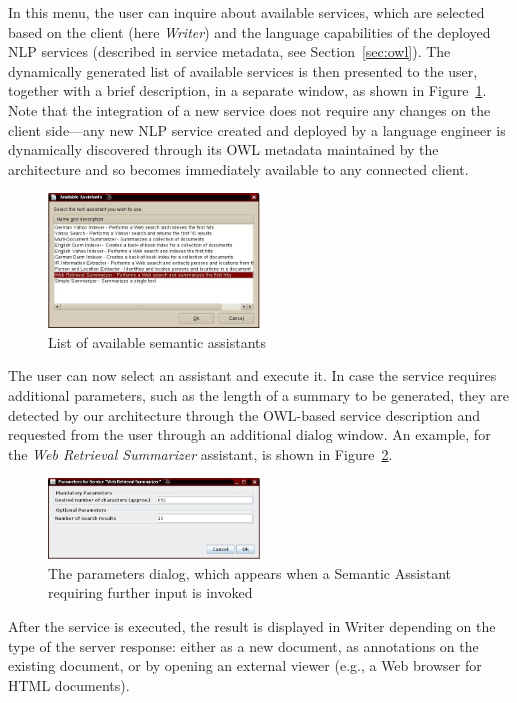 In this menu, the user can inquire about available services, which are
selected based on the client (here \emph{Writer}) and the language
capabilities of the deployed NLP services (described in service
metadata, see Section~\ref{sec:owl}). The dynamically generated list
of available services is then presented to the user, together with a
brief description, in a separate window, as shown in
Figure~\ref{fig:oolist}. Note that the integration of a new service
does not require any changes on the client side---any new NLP service
created and deployed by a language engineer is dynamically discovered
through its OWL metadata maintained by the architecture and so becomes
immediately available to any connected client.
\begin{figure}[htb]
  \centering
  \includegraphics[width=0.5\textwidth]{pictures/oolist.jpg}
  \caption{List of available semantic assistants}
  \label{fig:oolist}
\end{figure}

The user can now select an assistant and execute it. In case the
service requires additional parameters, such as the length of a
summary to be generated, they are detected by our architecture through
the OWL-based service description and requested from the user through
an additional dialog window. An example, for the \emph{Web Retrieval
  Summarizer} assistant, is shown in Figure~\ref{fig:ooparams}.
\begin{figure}[htb]
  \centering
  \includegraphics[width=0.5\textwidth]{pictures/ooparams.jpg}
  \caption{The parameters dialog, which appears when a Semantic
    Assistant requiring further input is invoked}
  \label{fig:ooparams}
\end{figure}
After the service is executed, the result is displayed in Writer depending on
the type of the server response: either as a new document, as annotations on
the existing document, or by opening an external viewer (e.g., a Web browser
for HTML documents).

